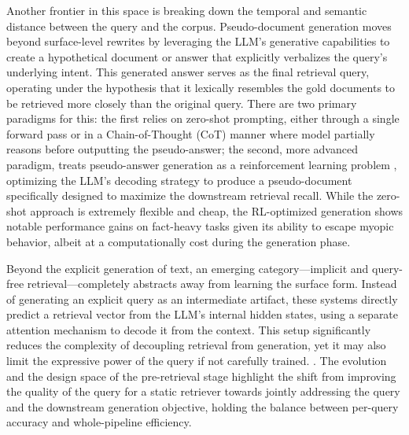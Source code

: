 \documentclass[11pt,a4paper]{article}
\begin{document}
Another frontier in this space is breaking down the temporal and semantic distance between the query and the corpus. Pseudo-document generation moves beyond surface-level rewrites by leveraging the LLM's generative capabilities to create a hypothetical document or answer that explicitly verbalizes the query's underlying intent. This generated answer serves as the final retrieval query, operating under the hypothesis that it lexically resembles the gold documents to be retrieved more closely than the original query. There are two primary paradigms for this: the first relies on zero-shot prompting, either through a single forward pass or in a Chain-of-Thought (CoT) manner where model partially reasons before outputting the pseudo-answer; the second, more advanced paradigm, treats pseudo-answer generation as a reinforcement learning problem \cite{arxiv:2501.18365v1}, optimizing the LLM's decoding strategy to produce a pseudo-document specifically designed to maximize the downstream retrieval recall. While the zero-shot approach is extremely flexible and cheap, the RL-optimized generation shows notable performance gains on fact-heavy tasks given its ability to escape myopic behavior, albeit at a computationally cost during the generation phase.

Beyond the explicit generation of text, an emerging category---implicit and query-free retrieval---completely abstracts away from learning the surface form. Instead of generating an explicit query as an intermediate artifact, these systems directly predict a retrieval vector from the LLM's internal hidden states, using a separate attention mechanism to decode it from the context. This setup significantly reduces the complexity of decoupling retrieval from generation, yet it may also limit the expressive power of the query if not carefully trained. \cite{arxiv:2005.11401v4,arxiv:2405.06211v3}. The evolution and the design space of the pre-retrieval stage highlight the shift from improving the quality of the query for a static retriever towards jointly addressing the query and the downstream generation objective, holding the balance between per-query accuracy and whole-pipeline efficiency.
\end{document}
